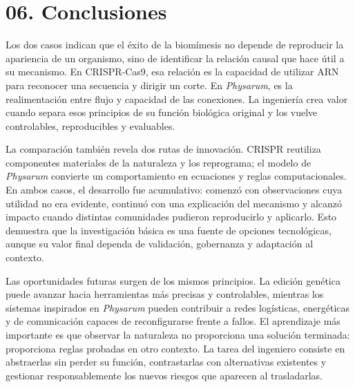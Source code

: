 \documentclass[11pt,letterpaper]{article}
\begin{document}
\section*{06. Conclusiones}

Los dos casos indican que el éxito de la biomímesis no depende de reproducir la
apariencia de un organismo, sino de identificar la relación causal que hace
útil a su mecanismo. En CRISPR-Cas9, esa relación es la capacidad de utilizar
ARN para reconocer una secuencia y dirigir un corte. En \emph{Physarum}, es la
realimentación entre flujo y capacidad de las conexiones. La ingeniería crea
valor cuando separa esos principios de su función biológica original y los
vuelve controlables, reproducibles y evaluables.

La comparación también revela dos rutas de innovación. CRISPR reutiliza
componentes materiales de la naturaleza y los reprograma; el modelo de
\emph{Physarum} convierte un comportamiento en ecuaciones y reglas
computacionales. En ambos casos, el desarrollo fue acumulativo: comenzó con
observaciones cuya utilidad no era evidente, continuó con una explicación del
mecanismo y alcanzó impacto cuando distintas comunidades pudieron reproducirlo
y aplicarlo. Esto demuestra que la investigación básica es una fuente de
opciones tecnológicas, aunque su valor final dependa de validación, gobernanza
y adaptación al contexto.

Las oportunidades futuras surgen de los mismos principios. La edición genética
puede avanzar hacia herramientas más precisas y controlables, mientras los
sistemas inspirados en \emph{Physarum} pueden contribuir a redes logísticas,
energéticas y de comunicación capaces de reconfigurarse frente a fallos. El
aprendizaje más importante es que observar la naturaleza no proporciona una
solución terminada: proporciona reglas probadas en otro contexto. La tarea del
ingeniero consiste en abstraerlas sin perder su función, contrastarlas con
alternativas existentes y gestionar responsablemente los nuevos riesgos que
aparecen al trasladarlas.

\printbibliography[title={07. Referencias bibliográficas}]
\end{document}
